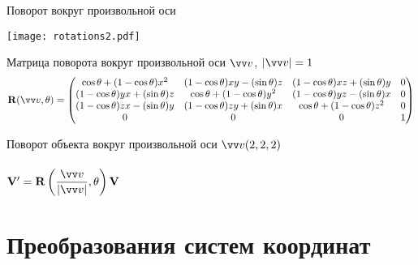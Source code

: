 \documentclass[10pt]{beamer}
\begin{document}
	\begin{frame}{Поворот вокруг произвольной оси}
		
	
		
				\centering
				\texttt{[image: rotations2.pdf]}
				
		
			\begin{block}{Матрица поворота вокруг произвольной оси $\vv v$, $|\vv v| = 1$}
			\footnotesize
			$$
			\mathbf{R}(\vv v, \theta) = 
			\begin{pmatrix}
				\cos \theta + (1 - \cos \theta) x^2
				& (1 - \cos \theta) x y - (\sin \theta) z 
				& (1 - \cos \theta) x z + (\sin \theta) y  
				& 0\\
				(1 - \cos \theta) y x + (\sin \theta) z 
				& \cos \theta + (1 - \cos \theta) y^2
				& (1 - \cos \theta) y z - (\sin \theta) x
				& 0\\
				(1 - \cos \theta) z x - (\sin \theta) y
				& (1 - \cos \theta) z y + (\sin \theta) x
				& \cos \theta + (1 - \cos \theta) z^2 
				& 0 \\
				0 & 0 & 0 & 1
			\end{pmatrix}
			$$
		\end{block}
		
	\end{frame}
	
  \begin{frame}{Поворот объекта вокруг произвольной оси}
  	{
  	}
  	{
  		$\vv v (2,2,2)$ \\ ~ \\
  		
  		$\mathbf V' = \mathbf R\left(\displaystyle\frac{\vv v }{|\vv v|},\theta\right)\mathbf V$
  	}
  	
  \end{frame}
  

\section{Преобразования систем координат}

\frame{\sectionpage}
\end{document}
